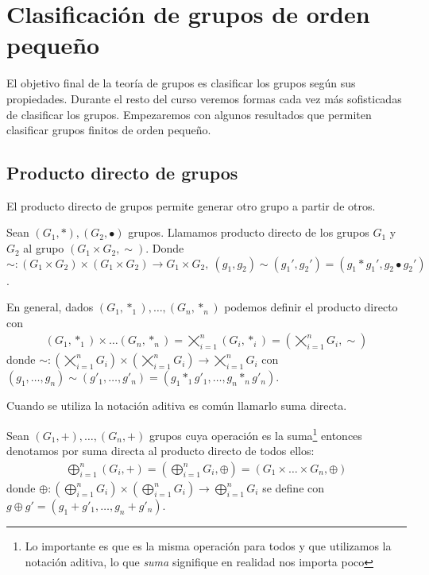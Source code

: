 
\chapter{Clasificación de grupos de orden pequeño}

El objetivo final de la teoría de grupos es clasificar los grupos según sus propiedades. Durante el resto del curso veremos formas cada vez más sofisticadas de clasificar los grupos. Empezaremos con algunos resultados que permiten clasificar grupos finitos de orden pequeño.

\section{Producto directo de grupos}

El producto directo de grupos permite generar otro grupo a partir de otros.

\begin{dfn}
	Sean $(G_1, \ast), (G_2, \bullet)$ grupos. Llamamos producto directo de los grupos $G_1$ y $G_2$ al grupo $(G_1\times G_2, \sim)$. Donde $\sim : (G_1 \times G_2) \times (G_1 \times G_2) \to G_1 \times G_2,\ (g_1, g_2) \sim (g_1', g_2') = (g_1\ast g_1', g_2 \bullet g_2')$.
	
	En general, dados $(G_1, \ast_1),\dots, (G_n, \ast_n)$ podemos definir el producto directo con
	\begin{align*}
		(G_1, \ast_1) \times \dots (G_n, \ast_n) = \varprod_{i=1}^n (G_i, \ast_i) = \left(\varprod_{i=1}^n G_i, \sim\right)
	\end{align*}
	donde $\sim: (\varprod_{i=1}^n G_i) \times (\varprod_{i=1}^n G_i) \to \varprod_{i=1}^n G_i$ con $(g_1, \dots, g_n) \sim (g'_1, \dots, g'_n) = (g_1 \ast_1 g'_1, \dots, g_n \ast_n g'_n)$.
\end{dfn}

Cuando se utiliza la notación aditiva es común llamarlo suma directa.

\begin{dfn}
	Sean $(G_1, +), \dots, (G_n, +)$ grupos cuya operación es la suma\footnote{Lo importante es que es la misma operación para todos y que utilizamos la notación aditiva, lo que \textit{suma} signifique en realidad nos importa poco} entonces denotamos por suma directa al producto directo de todos ellos:
	\begin{align*}
		\bigoplus_{i=1}^n (G_i, +) = \left(\bigoplus_{i=1}^n G_i, \oplus\right) = (G_1 \times \dots \times G_n, \oplus)
	\end{align*}
	donde $\oplus: (\bigoplus_{i=1}^n G_i) \times (\bigoplus_{i=1}^n G_i) \to \bigoplus_{i=1}^n G_i$ se define con $g \oplus g' = (g_1 + g'_1, \dots, g_n + g'_n)$.
\end{dfn}

